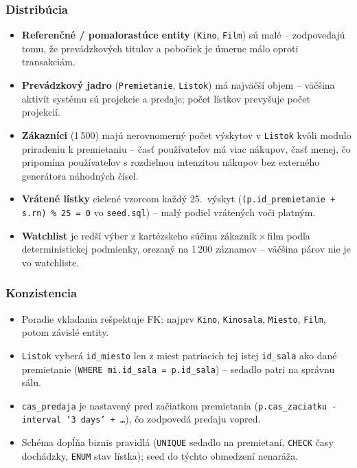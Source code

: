 \documentclass[11pt, a4paper]{article}
\begin{document}
\subsubsection*{Distribúcia}
\begin{itemize}
    \item \textbf{Referenčné / pomalorastúce entity} (\texttt{Kino}, \texttt{Film}) sú malé -- zodpovedajú tomu, že prevádzkových titulov a pobočiek je úmerne málo oproti transakciám.
    \item \textbf{Prevádzkový jadro} (\texttt{Premietanie}, \texttt{Listok}) má najväčší objem -- väčšina aktivít systému sú projekcie a predaje; počet lístkov prevyšuje počet projekcií.
    \item \textbf{Zákazníci} (1\,500) majú nerovnomerný počet výskytov v \texttt{Listok} kvôli modulo priradeniu k premietaniu -- časť používateľov má viac nákupov, časť menej, čo pripomína používateľov s rozdielnou intenzitou nákupov bez externého generátora náhodných čísel.
    \item \textbf{Vrátené lístky} cielené vzorcom každý 25.\ výskyt (\texttt{(p.id\_premietanie + s.rn) \% 25 = 0} vo \texttt{seed.sql}) -- malý podiel vrátených voči platným.
    \item \textbf{Watchlist} je redší výber z kartézskeho súčinu zákazník\,×\,film podľa deterministickej podmienky, orezaný na 1\,200 záznamov -- väčšina párov nie je vo watchliste.
\end{itemize}

\subsubsection*{Konzistencia}
\begin{itemize}
    \item Poradie vkladania rešpektuje FK: najprv \texttt{Kino}, \texttt{Kinosala}, \texttt{Miesto}, \texttt{Film}, potom závislé entity.
    \item \texttt{Listok} vyberá \texttt{id\_miesto} len z miest patriacich tej istej \texttt{id\_sala} ako dané premietanie (\texttt{WHERE mi.id\_sala = p.id\_sala}) -- sedadlo patri na správnu sálu.
    \item \texttt{cas\_predaja} je nastavený pred začiatkom premietania (\texttt{p.cas\_zaciatku - interval '3 days' + \ldots}), čo zodpovedá predaju vopred.
    \item Schéma dopĺňa biznis pravidlá (\texttt{UNIQUE} sedadlo na premietaní, \texttt{CHECK} časy dochádzky, \texttt{ENUM} stav lístka); seed do týchto obmedzení nenaráža.
\end{itemize}
\end{document}
